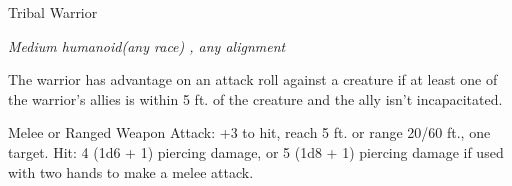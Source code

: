 \begin{monsterbox}{Tribal Warrior}
\begin{hangingpar}
\textit{Medium humanoid(any race) , any alignment}
\end{hangingpar}
\dndline%
\basics[%
armorclass = 12,
hitpoints = 2d8 + 2,
speed = {30 ft.}
]
\dndline%
\stats[%
STR = \stat{13},
DEX = \stat{11},
CON = \stat{12},
INT = \stat{8},
WIS = \stat{11},
CHA = \stat{8}
]
\dndline%
\details[%
skills={},
damageimmunities={},
savingthrows={},
conditionimmunities={},
damageresistances={},
damagevulnerabilities={},
senses={passive Perception 10},
languages={any one language},
challenge=1/8
]
\dndline%
\begin{monsteraction}
The warrior has advantage on an attack roll against a creature if at least one of the warrior's allies is within 5 ft. of the creature and the ally isn't incapacitated.
\end{monsteraction}
\begin{monsteraction}[Spear]
Melee or Ranged Weapon Attack: +3 to hit, reach 5 ft. or range 20/60 ft., one target. Hit: 4 (1d6 + 1) piercing damage, or 5 (1d8 + 1) piercing damage if used with two hands to make a melee attack.
\end{monsteraction}
\end{monsterbox}